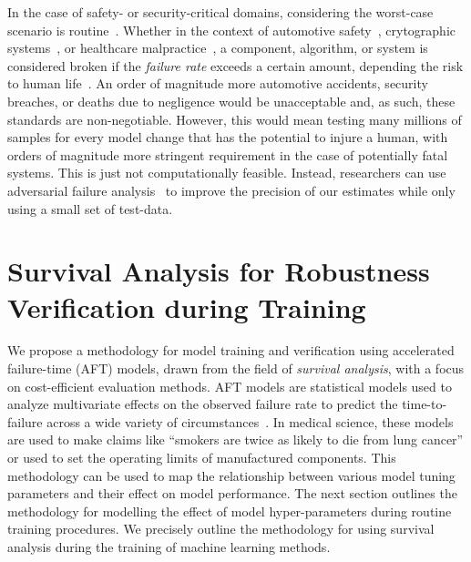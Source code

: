 \documentclass[conference]{IEEEtran}
\begin{document}
In the case of safety- or security-critical domains, considering the worst-case scenario is routine~\cite{sajid2013cloud}. Whether in the context of automotive safety~\cite{ai_automotive}, crytographic systems~\cite{leurent2020sha,kamal2017study}, or healthcare malpractice~\cite{ai_medical_imaging}, a component, algorithm, or system is considered broken if the \textit{failure rate} exceeds a certain amount, depending the risk to human life~\cite{IEC61508}. An order of magnitude more automotive accidents, security breaches, or deaths due to negligence would be unacceptable and, as such, these standards are non-negotiable. However, this would mean testing many millions of samples for every model change that has the potential to injure a human, with orders of magnitude more stringent requirement in the case of potentially fatal systems. This is just not computationally feasible. Instead, researchers can use adversarial failure analysis~\cite{carlini_towards_2017,biggio_evasion_2013,meyers} to improve the precision of our estimates while only using a small set of test-data.





\section{Survival Analysis for Robustness Verification during Training}
\label{aft}

We propose a methodology for model training and verification using accelerated failure-time (AFT) models, drawn from the field of \textit{survival analysis}, with a focus on cost-efficient evaluation methods.
AFT models are statistical models used to analyze multivariate effects on the observed failure rate to predict the time-to-failure across a wide variety of circumstances~\cite{aft_models,kleinbaum1996survival}. In medical science, these models are used to make claims like ``smokers are twice as likely to die from lung cancer'' or used to set the operating limits of manufactured components. This methodology can be used to map the relationship between various model tuning parameters and their effect on model performance.
The next section outlines the methodology for modelling the effect of model hyper-parameters during routine training procedures. We precisely outline the methodology for using survival analysis during the training of machine learning methods. 
\end{document}
